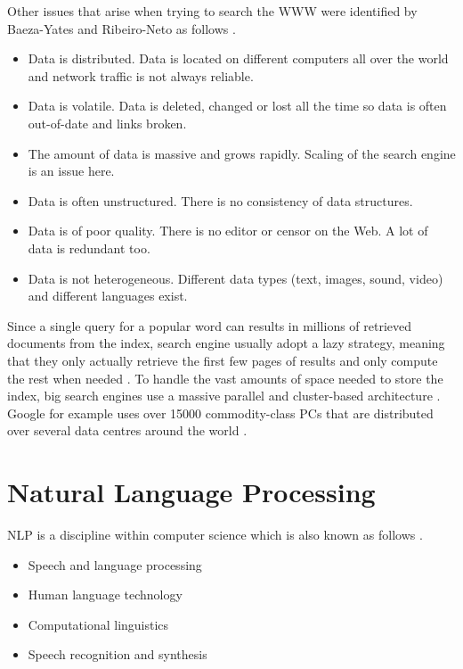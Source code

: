 Other issues that arise when trying to search the \ac{WWW} were identified by Baeza-Yates and Ribeiro-Neto as follows \autocite*{Baeza-Yates2011}.

\begin{itemize}
  \item Data is distributed. Data is located on different computers all over the world and network traffic is not always reliable.
  \item Data is volatile. Data is deleted, changed or lost all the time so data is often out-of-date and links broken.
  \item The amount of data is massive and grows rapidly. Scaling of the search engine is an issue here.
  \item Data is often unstructured. There is no consistency of data structures.
  \item Data is of poor quality. There is no editor or censor on the Web. A lot of data is redundant too.
  \item Data is not heterogeneous. Different data types (text, images, sound, video) and different languages exist.
\end{itemize}

Since a single query for a popular word can results in millions of retrieved documents from the index, search engine usually adopt a lazy strategy, meaning that they only actually retrieve the first few pages of results and only compute the rest when needed \autocite{Baeza-Yates2011}. To handle the vast amounts of space needed to store the index, big search engines use a massive parallel and cluster-based architecture \autocite{Baeza-Yates2011}. Google for example uses over \num{15000} commodity-class PCs that are distributed over several data centres around the world \autocite{Dean2003}.


\section{Natural Language Processing}
\label{s:nlp}

\acf{NLP} is a discipline within computer science which is also known as follows \autocite{Jurafsky2009}.

\begin{itemize}
  \item Speech and language processing
  \item Human language technology
  \item Computational linguistics
  \item Speech recognition and synthesis
\end{itemize}

